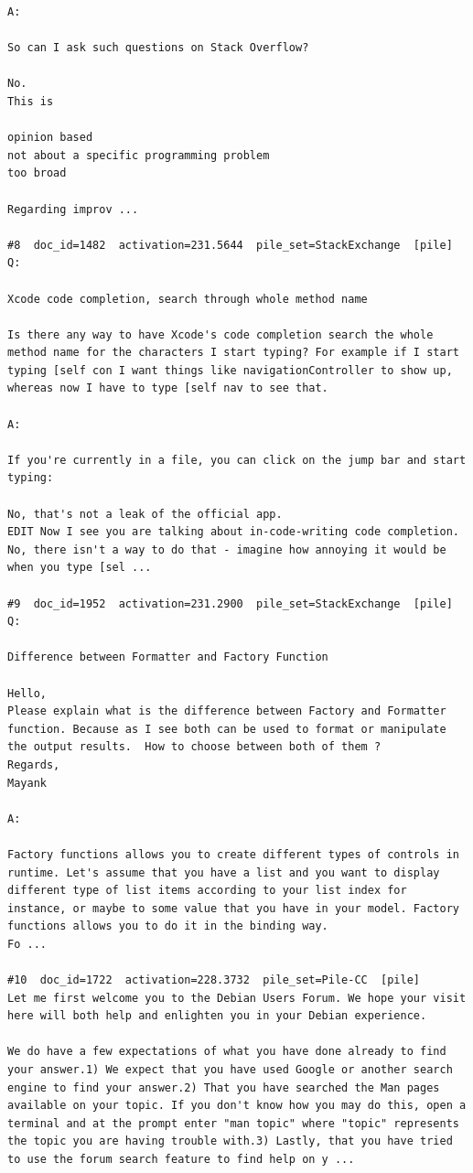\begin{verbatim}
A:

So can I ask such questions on Stack Overflow?

No.
This is

opinion based 
not about a specific programming problem 
too broad

Regarding improv ...

#8  doc_id=1482  activation=231.5644  pile_set=StackExchange  [pile]
Q:

Xcode code completion, search through whole method name

Is there any way to have Xcode's code completion search the whole method name for the characters I start typing? For example if I start typing [self con I want things like navigationController to show up, whereas now I have to type [self nav to see that.

A:

If you're currently in a file, you can click on the jump bar and start typing:

No, that's not a leak of the official app.
EDIT Now I see you are talking about in-code-writing code completion. No, there isn't a way to do that - imagine how annoying it would be when you type [sel ...

#9  doc_id=1952  activation=231.2900  pile_set=StackExchange  [pile]
Q:

Difference between Formatter and Factory Function

​Hello,
Please explain what is the difference between Factory and Formatter function. Because as I see both can be used to format or manipulate the output results.  How to choose between both of them ?
Regards,
Mayank

A:

Factory functions allows you to create different types of controls in runtime. Let's assume that you have a list and you want to display different type of list items according to your list index for instance, or maybe to some value that you have in your model. Factory functions allows you to do it in the binding way. 
Fo ...

#10  doc_id=1722  activation=228.3732  pile_set=Pile-CC  [pile]
Let me first welcome you to the Debian Users Forum. We hope your visit here will both help and enlighten you in your Debian experience.

We do have a few expectations of what you have done already to find your answer.1) We expect that you have used Google or another search engine to find your answer.2) That you have searched the Man pages available on your topic. If you don't know how you may do this, open a terminal and at the prompt enter "man topic" where "topic" represents the topic you are having trouble with.3) Lastly, that you have tried to use the forum search feature to find help on y ...


\end{verbatim}
